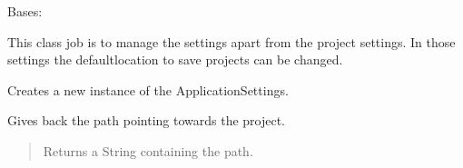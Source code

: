\documentclass[letterpaper,10pt,english]{sphinxmanual}
\begin{document}
\begin{fulllineitems}
\label{\detokenize{apidoc/src.osm_configurator.model.application:src.osm_configurator.model.application.application_settings.ApplicationSettings}}
\pysigstartsignatures
{}
\pysigstopsignatures
\sphinxAtStartPar
Bases: 

\sphinxAtStartPar
This class job is to manage the settings apart from the project settings. In those settings the default\sphinxhyphen{}location
to save projects can be changed.

\begin{fulllineitems}
\label{\detokenize{apidoc/src.osm_configurator.model.application:src.osm_configurator.model.application.application_settings.ApplicationSettings.__init__}}
\pysigstartsignatures
{}
\pysigstopsignatures
\sphinxAtStartPar
Creates a new instance of the ApplicationSettings.

\end{fulllineitems}


\begin{fulllineitems}
\label{\detokenize{apidoc/src.osm_configurator.model.application:src.osm_configurator.model.application.application_settings.ApplicationSettings.get_location}}
\pysigstartsignatures
{}
\pysigstopsignatures
\sphinxAtStartPar
Gives back the path pointing towards the project.
\begin{quote}\begin{description}
\sphinxAtStartPar
Returns a String containing the path.

\sphinxAtStartPar
{}

\end{description}\end{quote}

\end{fulllineitems}


\end{fulllineitems}
\end{document}
